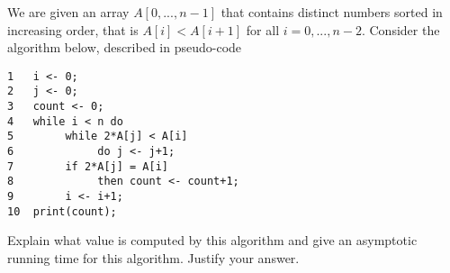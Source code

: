 \documentclass[11pt]{article}
\begin{document}
\begin{problem}
We are given an array $A[0,...,n-1]$ that contains distinct numbers sorted 
in increasing order, that is $A[i] < A[i+1]$ for all $i=0,...,n-2$.
Consider the algorithm below, described in pseudo-code

\begin{center}
\begin{minipage}{3in}
\begin{verbatim}
1	i <- 0;
2	j <- 0;
3	count <- 0;
4	while i < n do
5	     while 2*A[j] < A[i] 
6	          do j <- j+1;
7	     if 2*A[j] = A[i] 
8	          then count <- count+1;
9	     i <- i+1;
10	print(count);
\end{verbatim}
\end{minipage}
\end{center}

Explain what value is computed by this algorithm and
give an asymptotic running time for this algorithm.
Justify your answer. 
\end{problem}


\end{document}
